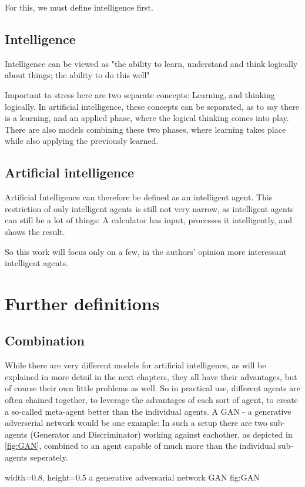 For this, we must define intelligence first.
\subsection{Intelligence}
Intelligence can be viewed as "the ability to learn, understand and think logically about things; the ability to do this well" 
\cite{intelligence}

Important to stress here are two separate concepts: Learning, and thinking logically.
In artificial intelligence, these concepts can be separated, as to say there is a learning, and an applied phase, where the logical thinking comes into play. %
There are also models combining these two phases, where learning takes place while also applying the previously learned. 


\subsection{Artificial intelligence}
Artificial Intelligence can therefore be defined as an intelligent agent.
This restriction of only intelligent agents is still not very narrow, as intelligent agents can still be a lot of things: A calculator has input, processes it intelligently, and shows the result.

So this work will focus only on a few, in the authors' opinion more interessant intelligent agents.
\section{Further definitions}
\subsection{Combination}
While there are very different models for artificial intelligence, as will be explained in more detail in the next chapters, they all have their advantages, but of course their own little problems as well. So in practical use, different agents are often chained together, to leverage the advantages of each sort of agent, to create a so-called meta-agent better than the individual agents.
A GAN - a generative adverserial network would be one example: In such a setup there are two sub-agents (Generator and Discriminator) working against eachother, as depicted in \ref{fig:GAN}, combined to an agent capable of much more than the individual sub-agents seperately.

    {width=0.8\textwidth, height=0.5\textheight} %
    {a generative adversarial network}   %
    {GAN}   %
    {fig:GAN}    %


